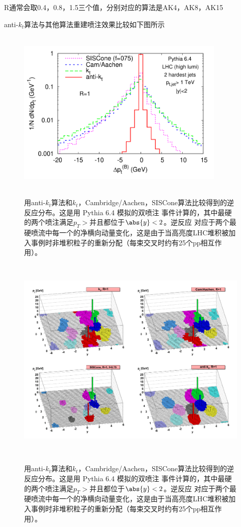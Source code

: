 R通常会取0.4，0.8，1.5三个值，分别对应的算法是AK4，AK8，AK15

anti-$k_t$算法与其他算法重建喷注效果比较如下图所示
\begin{figure}[H]
 \centering
 \caption{用anti-$k_t$算法和$k_t$，Cambridge/Aachen，SISCone算法比较得到的逆反应分布。这是用 Pythia 6.4 模拟的双喷注 事件计算的，其中最硬的两个喷注满足$p_T>$并且都位于$\abs{y}<2$。逆反应
对应于两个最硬喷流中每一个的净横向动量变化，这是由于当高亮度LHC堆积被加入事例时非堆积粒子的重新分配（每束交叉时约有25个pp相互作用）。}
 \includegraphics[height=8cm, width=10cm]{pictures/anti-kt.png}
 \label{fig2.1}
\end{figure}


\begin{figure}[H]
 \centering
 \caption{用anti-$k_t$算法和$k_t$，Cambridge/Aachen，SISCone算法比较得到的逆反应分布。这是用 Pythia 6.4 模拟的双喷注 事件计算的，其中最硬的两个喷注满足$p_T>$并且都位于$\abs{y}<2$。逆反应
对应于两个最硬喷流中每一个的净横向动量变化，这是由于当高亮度LHC堆积被加入事例时非堆积粒子的重新分配（每束交叉时约有25个pp相互作用）。}
 \includegraphics[height=10cm, width=13cm]{pictures/anti-kt-3D.png}
 \label{fig2.2}
\end{figure}

